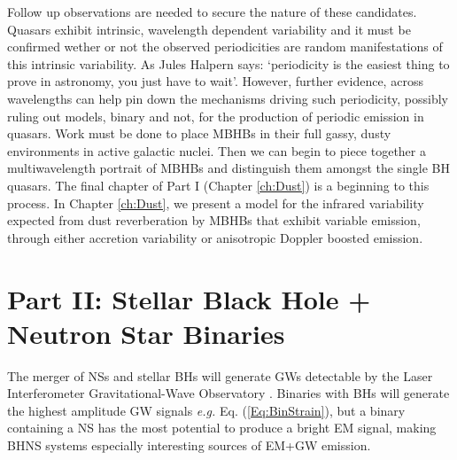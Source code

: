 Follow up observations are needed to secure the nature of these candidates.
Quasars exhibit intrinsic, wavelength dependent variability
\citep{Kelly:2009:DRW,Kozlowski+2010} and it must be confirmed wether or not
the observed periodicities are random manifestations of this intrinsic
variability. As Jules Halpern says: `periodicity is the easiest thing to prove
in astronomy, you just have to wait'. However, further evidence, across
wavelengths can help pin down the mechanisms driving such periodicity,
possibly ruling out models, binary and not, for the production of periodic
emission in quasars. Work must be done to place MBHBs in their full gassy,
dusty environments in active galactic nuclei. Then we can begin to piece
together a multiwavelength portrait of MBHBs and distinguish them amongst the
single BH quasars. The final chapter of Part I (Chapter \ref{ch:Dust}) is a
beginning to this process. In Chapter \ref{ch:Dust}, we present a model for
the infrared variability expected from dust reverberation by MBHBs that
exhibit variable emission, through either accretion variability or anisotropic
Doppler boosted emission.




































\section{Part II: Stellar Black Hole + Neutron Star Binaries}

The merger of NSs and stellar BHs will generate GWs detectable by the Laser
Interferometer Gravitational-Wave Observatory \citep[LIGO][]{aLIGO:2015}.
Binaries with BHs will generate the highest amplitude GW signals \emph{e.g.}
Eq. (\ref{Eq:BinStrain}), but a binary containing a NS has the most potential to
produce a bright EM signal, making BHNS systems especially interesting sources
of EM+GW emission.


